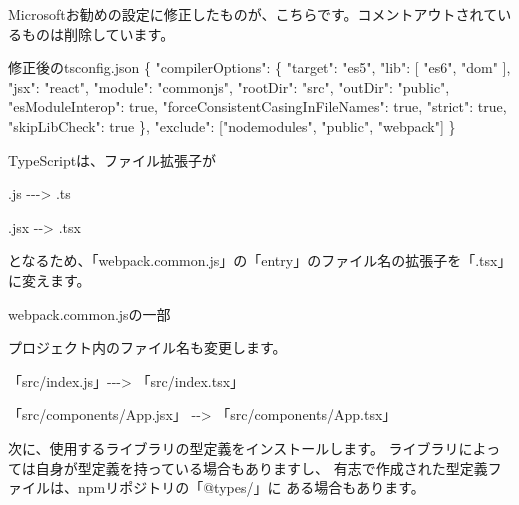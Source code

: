 Microsoftお勧めの設定に修正したものが、こちらです。コメントアウトされているものは削除しています。

\def\startercodeblockfontsize{}
\begin{starterprogram}[]{修正後のtsconfig.json}  \{
    "compilerOptions": \{
      "target": "es5",
      "lib": [
        "es6",
        "dom"
      ],
      "jsx": "react",
      "module": "commonjs",
      "rootDir": "src",
      "outDir": "public",
      "esModuleInterop": true,
      "forceConsistentCasingInFileNames": true,
      "strict": true,
      "skipLibCheck": true
    \},
    "exclude": ["node\textunderscore{}modules", "public", "webpack"]
  \}
\end{starterprogram}

TypeScriptは、ファイル拡張子が

\begin{starteritemize}
\item .js {-}{-}{-}\textgreater{} .ts
\item .jsx {-}{-}\textgreater{} .tsx
\end{starteritemize}

となるため、「webpack.common.js」の「entry」のファイル名の拡張子を「.tsx」に変えます。

\def\startercodeblockfontsize{}
\begin{starterprogram}[]{webpack.common.jsの一部}\end{starterprogram}

プロジェクト内のファイル名も変更します。

\begin{starteritemize}
\item 「src/index.js」{-}{-}{-}\textgreater{} 「src/index.tsx」
\item 「src/components/App.jsx」 {-}{-}\textgreater{} 「src/components/App.tsx」
\end{starteritemize}

次に、使用するライブラリの型定義をインストールします。
ライブラリによっては自身が型定義を持っている場合もありますし、
有志で作成された型定義ファイルは、npmリポジトリの「@types/」に
ある場合もあります。

